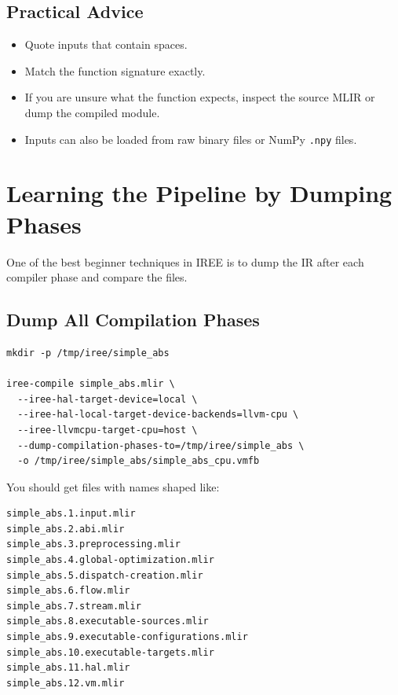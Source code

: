 \documentclass[11pt,a4paper]{article}
\begin{document}
\subsection{Practical Advice}

\begin{itemize}
    \item Quote inputs that contain spaces.
    \item Match the function signature exactly.
    \item If you are unsure what the function expects, inspect the source MLIR or dump the compiled module.
    \item Inputs can also be loaded from raw binary files or NumPy \texttt{.npy} files.
\end{itemize}

\section{Learning the Pipeline by Dumping Phases}

One of the best beginner techniques in IREE is to dump the IR after each compiler phase and compare the files.

\subsection{Dump All Compilation Phases}

\begin{lstlisting}[caption=Dump the pipeline step by step]
mkdir -p /tmp/iree/simple_abs

iree-compile simple_abs.mlir \
  --iree-hal-target-device=local \
  --iree-hal-local-target-device-backends=llvm-cpu \
  --iree-llvmcpu-target-cpu=host \
  --dump-compilation-phases-to=/tmp/iree/simple_abs \
  -o /tmp/iree/simple_abs/simple_abs_cpu.vmfb
\end{lstlisting}

You should get files with names shaped like:

\begin{lstlisting}[caption=Typical dumped phase files]
simple_abs.1.input.mlir
simple_abs.2.abi.mlir
simple_abs.3.preprocessing.mlir
simple_abs.4.global-optimization.mlir
simple_abs.5.dispatch-creation.mlir
simple_abs.6.flow.mlir
simple_abs.7.stream.mlir
simple_abs.8.executable-sources.mlir
simple_abs.9.executable-configurations.mlir
simple_abs.10.executable-targets.mlir
simple_abs.11.hal.mlir
simple_abs.12.vm.mlir
\end{lstlisting}
\end{document}
